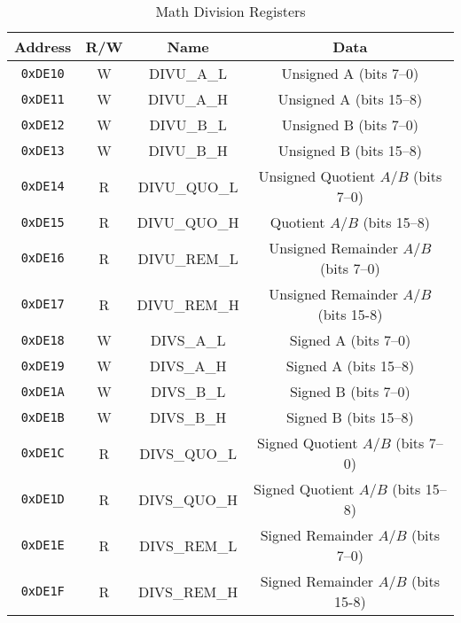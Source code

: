 \begin{table}[ht]
    \begin{center}
        \begin{tabular}{|c|c|c|c|} \hline
            Address & R/W & Name & Data \\\hline\hline
            \verb+0xDE10+ & W & DIVU\_A\_L & Unsigned A (bits 7--0) \\ \hline
            \verb+0xDE11+ & W & DIVU\_A\_H & Unsigned A (bits 15--8) \\ \hline
            \verb+0xDE12+ & W & DIVU\_B\_L & Unsigned B (bits 7--0) \\ \hline
            \verb+0xDE13+ & W & DIVU\_B\_H & Unsigned B (bits 15--8) \\ \hline
            \verb+0xDE14+ & R & DIVU\_QUO\_L & Unsigned Quotient $A / B$ (bits 7--0) \\ \hline
            \verb+0xDE15+ & R & DIVU\_QUO\_H & Quotient $A / B$ (bits 15--8) \\ \hline
            \verb+0xDE16+ & R & DIVU\_REM\_L & Unsigned Remainder $A / B$ (bits 7--0) \\ \hline
            \verb+0xDE17+ & R & DIVU\_REM\_H & Unsigned Remainder $A / B$ (bits 15-8) \\ \hline\hline

            \verb+0xDE18+ & W & DIVS\_A\_L & Signed A (bits 7--0) \\ \hline
            \verb+0xDE19+ & W & DIVS\_A\_H & Signed A (bits 15--8) \\ \hline
            \verb+0xDE1A+ & W & DIVS\_B\_L & Signed B (bits 7--0) \\ \hline
            \verb+0xDE1B+ & W & DIVS\_B\_H & Signed B (bits 15--8) \\ \hline
            \verb+0xDE1C+ & R & DIVS\_QUO\_L & Signed Quotient $A / B$ (bits 7--0) \\ \hline
            \verb+0xDE1D+ & R & DIVS\_QUO\_H & Signed Quotient $A / B$ (bits 15--8) \\ \hline
            \verb+0xDE1E+ & R & DIVS\_REM\_L & Signed Remainder $A / B$ (bits 7--0) \\ \hline
            \verb+0xDE1F+ & R & DIVS\_REM\_H & Signed Remainder $A / B$ (bits 15-8) \\ \hline\hline
        \end{tabular}
    \end{center}
    \caption{Math Division Registers}
    \label{tab:math_div_reg}
\end{table}